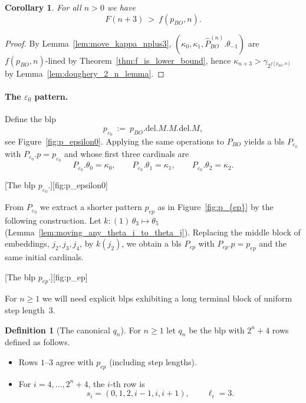 \documentclass{article}
\newtheorem{corollary}[lemma]{Corollary}
\theoremstyle{definition}
\newtheorem{definition}[lemma]{Definition}
\theoremstyle{remark}
\begin{document}
\begin{corollary}\label{cor:F-lower-bound-BO}
For all $n>0$ we have
\[
F(n+3)\ >\ f(p_{BO},n).
\]
\end{corollary}

\begin{proof}
By Lemma~\ref{lem:move_kappa_nplus3}, $(\kappa_0,\kappa_1,\widehat P_{BO}^{(n)}.\theta_{-1})$ are $f(p_{BO},n)$-lined by Theorem~\ref{thm:f_is_lower_bound}, hence $\kappa_{n+3}>\gamma_{2^{f(p_{BO},n)}}$ by Lemma~\ref{lem:doughery_2_n_lemma}. 
\end{proof}

\paragraph{The $\varepsilon_0$ pattern.}
Define the blp
\[
p_{\varepsilon_0}\ :=\ p_{BO}.{\mathrm{del}}.M.M.{\mathrm{del}.M},
\]
see Figure~\ref{fig:p_epsilon0}. Applying the same operations to $P_{BO}$ yields a bls $P_{\varepsilon_0}$ with $P_{\varepsilon_0}.p=p_{\varepsilon_0}$ and whose first three cardinals are
\[
P_{\varepsilon_0}.\theta_0=\kappa_0,\qquad P_{\varepsilon_0}.\theta_1=\kappa_1,\qquad P_{\varepsilon_0}.\theta_2=\kappa_2.
\]

[The blp $p_{\varepsilon_0}$.][fig:p_epsilon0]


From $P_{\varepsilon_0}$ we extract a shorter pattern $p_{ep}$ as in Figure~\ref{fig:p_{ep}} by the following construction. Let $k:(1)\,\theta_3\mapsto\theta_5$ (Lemma~\ref{lem:moving_any_theta_i_to_theta_j}). Replacing the middle block of embeddings, $j_2,j_3,j_4$, by $k(j_2)$, we obtain a bls $P_{ep}$ with $P_{ep}.p=p_{ep}$ and the same initial cardinals.

[The blp $p_{ep}$.][fig:p_{ep}]


For $n\ge 1$ we will need explicit blps exhibiting a long terminal block of uniform step length~$3$.

\begin{definition}[The canonical $q_n$]\label{def:q_n}
For $n\ge 1$ let $q_n$ be the blp with $2^n+4$ rows defined as follows.
\begin{itemize}
  \item Rows $1$–$3$ agree with $p_{ep}$ (including step lengths).
  \item For $i=4,\dots,2^n+4$, the $i$-th row is
  \[
  s_i=(0,1,2,i-1,i,i+1),\qquad \ell_i=3.
  \]
\end{itemize}
\end{definition}
\end{document}
